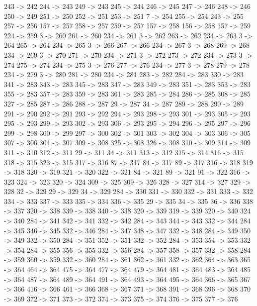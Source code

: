 {	243 -> 242
	244 -> 243
	249 -> 243
	245 -> 244
	246 -> 245
	247 -> 246
	248 -> 246
	250 -> 249
	251 -> 250
	252 -> 251
	253 -> 251
	7 -> 254
	255 -> 254
	243 -> 255
	257 -> 256
	157 -> 257
	258 -> 257
	259 -> 257
	157 -> 258
	156 -> 258
	157 -> 259
	224 -> 259
	3 -> 260
	261 -> 260
	234 -> 261
	3 -> 262
	263 -> 262
	234 -> 263
	3 -> 264
	265 -> 264
	234 -> 265
	3 -> 266
	267 -> 266
	234 -> 267
	3 -> 268
	269 -> 268
	234 -> 269
	3 -> 270
	271 -> 270
	234 -> 271
	3 -> 272
	273 -> 272
	234 -> 273
	3 -> 274
	275 -> 274
	234 -> 275
	3 -> 276
	277 -> 276
	234 -> 277
	3 -> 278
	279 -> 278
	234 -> 279
	3 -> 280
	281 -> 280
	234 -> 281
	283 -> 282
	284 -> 283
	330 -> 283
	341 -> 283
	343 -> 283
	345 -> 283
	347 -> 283
	349 -> 283
	351 -> 283
	353 -> 283
	355 -> 283
	357 -> 283
	359 -> 283
	361 -> 283
	285 -> 284
	286 -> 285
	308 -> 285
	327 -> 285
	287 -> 286
	288 -> 287
	29 -> 287
	34 -> 287
	289 -> 288
	290 -> 289
	291 -> 290
	292 -> 291
	293 -> 292
	294 -> 293
	298 -> 293
	301 -> 293
	305 -> 293
	295 -> 293
	299 -> 293
	302 -> 293
	306 -> 293
	295 -> 294
	296 -> 295
	297 -> 296
	299 -> 298
	300 -> 299
	297 -> 300
	302 -> 301
	303 -> 302
	304 -> 303
	306 -> 305
	307 -> 306
	304 -> 307
	309 -> 308
	325 -> 308
	326 -> 308
	310 -> 309
	314 -> 309
	311 -> 310
	312 -> 311
	29 -> 311
	34 -> 311
	313 -> 312
	315 -> 314
	316 -> 315
	318 -> 315
	323 -> 315
	317 -> 316
	87 -> 317
	84 -> 317
	89 -> 317
	316 -> 318
	319 -> 318
	320 -> 319
	321 -> 320
	322 -> 321
	84 -> 321
	89 -> 321
	91 -> 322
	316 -> 323
	324 -> 323
	320 -> 324
	309 -> 325
	309 -> 326
	328 -> 327
	314 -> 327
	329 -> 328
	32 -> 329
	29 -> 329
	34 -> 329
	284 -> 330
	331 -> 330
	332 -> 331
	333 -> 332
	334 -> 333
	337 -> 333
	335 -> 334
	336 -> 335
	29 -> 335
	34 -> 335
	36 -> 336
	338 -> 337
	320 -> 338
	339 -> 338
	340 -> 338
	320 -> 339
	319 -> 339
	320 -> 340
	324 -> 340
	284 -> 341
	342 -> 341
	332 -> 342
	284 -> 343
	344 -> 343
	332 -> 344
	284 -> 345
	346 -> 345
	332 -> 346
	284 -> 347
	348 -> 347
	332 -> 348
	284 -> 349
	350 -> 349
	332 -> 350
	284 -> 351
	352 -> 351
	332 -> 352
	284 -> 353
	354 -> 353
	332 -> 354
	284 -> 355
	356 -> 355
	332 -> 356
	284 -> 357
	358 -> 357
	332 -> 358
	284 -> 359
	360 -> 359
	332 -> 360
	284 -> 361
	362 -> 361
	332 -> 362
	364 -> 363
	365 -> 364
	464 -> 364
	475 -> 364
	477 -> 364
	479 -> 364
	481 -> 364
	483 -> 364
	485 -> 364
	487 -> 364
	489 -> 364
	491 -> 364
	493 -> 364
	495 -> 364
	366 -> 365
	367 -> 366
	416 -> 366
	461 -> 366
	368 -> 367
	371 -> 368
	391 -> 368
	396 -> 368
	370 -> 369
	372 -> 371
	373 -> 372
	374 -> 373
	375 -> 374
	376 -> 375
	377 -> 376
}

